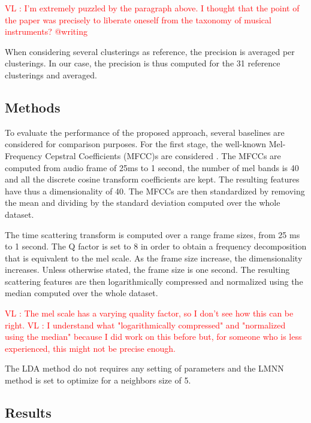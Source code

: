 \documentclass{article}
\newcommand{\vl}[1]{\textcolor{red}{VL : #1}}
\begin{document}
\vl{I'm extremely puzzled by the paragraph above. I thought that the point of the paper was precisely to liberate oneself from the taxonomy of musical instruments? @writing}

When considering several clusterings as reference, the precision is averaged per clusterings. In our case, the precision is thus computed for the 31 reference clusterings and averaged.

\subsection{Methods}

To evaluate the performance of the proposed approach, several baselines are considered for comparison purposes. For the first stage, the well-known Mel-Frequency Cepstral Coefficients (MFCC)s are considered \cite{rabiner1993fundamentals}. The MFCCs are computed from audio frame of 25ms to 1 second, the number of mel bands is 40 and all the discrete cosine transform coefficients are kept. The resulting features have thus a dimensionality of 40. The MFCCs are then standardized by removing the mean and dividing by the standard deviation computed over the whole dataset.

The time scattering transform is computed over a range frame sizes, from 25 ms to 1 second. The Q factor is set to 8 in order to obtain a frequency decomposition that is equivalent to the mel scale. As the frame size increase, the dimensionality increases. Unless otherwise stated, the frame size is one second. The resulting scattering features are then logarithmically compressed and normalized using the median computed over the whole dataset.

\vl{The mel scale has a varying quality factor, so I don't see how this can be right.}
\vl{I understand what "logarithmically compressed" and "normalized using the median" because I did work on this before but,
for someone who is less experienced, this might not be precise enough.}

The LDA method do not requires any setting of parameters and the LMNN method is set to optimize for a neighbors size of 5.

\subsection{Results}
\end{document}
